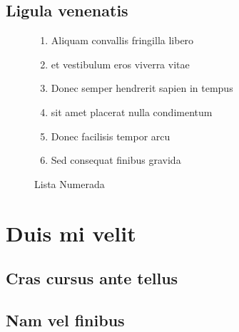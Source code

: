 \lipsum[3]

\section{Ligula venenatis}

\lipsum[6]

\begin{figure}
\begin{enumerate}
\item Aliquam convallis fringilla libero
\item et vestibulum eros viverra vitae
\item Donec semper hendrerit sapien in tempus
\item sit amet placerat nulla condimentum
\item Donec facilisis tempor arcu
\item Sed consequat finibus gravida
\end{enumerate}
\caption{Lista Numerada}
\end{figure}

\lipsum[3]

\chapter{Duis mi velit}

\section{Cras cursus ante tellus}
\lipsum[3]

\section{Nam vel finibus}

\lipsum[8]
